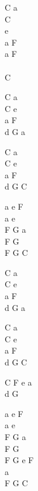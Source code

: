 \begin{chord}
    C a\\
    C\\
    e\\
    a F\\
    a F\\
    \\
    C

    C a\\
    C e\\
    a F\\
    d G a

    C a\\
    C e\\
    a F\\
    d G C

    a e F\\
    a e\\
    F G a\\
    F G\\
    F G C

    C a\\
    C e\\
    a F\\
    d G a

    C a\\
    C e\\
    a F\\
    d G C

    C F e a\\
    d G

    a e F\\
    a e\\
    F G a\\
    F G\\
    F G e F\\
    a\\
    F G C
\end{chord}